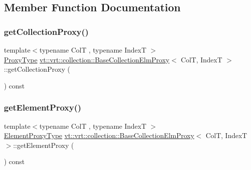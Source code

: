 \subsection{Member Function Documentation}
\mbox{\label{structvt_1_1vrt_1_1collection_1_1_base_collection_elm_proxy_ae2b8c7f266600f1c68c2036f6be2a463}} 
\subsubsection{\texorpdfstring{get\+Collection\+Proxy()}{getCollectionProxy()}}
{\footnotesize\ttfamily template$<$typename ColT , typename IndexT $>$ \\
\hyperlink{structvt_1_1vrt_1_1collection_1_1_base_collection_elm_proxy_af80f1576659b626a30828c6d85eca926}{Proxy\+Type} \hyperlink{structvt_1_1vrt_1_1collection_1_1_base_collection_elm_proxy}{vt\+::vrt\+::collection\+::\+Base\+Collection\+Elm\+Proxy}$<$ ColT, IndexT $>$\+::get\+Collection\+Proxy (\begin{DoxyParamCaption}{ }\end{DoxyParamCaption}) const\hspace{0.3cm}{\ttfamily [inline]}}

\mbox{\label{structvt_1_1vrt_1_1collection_1_1_base_collection_elm_proxy_a3d5a9639713eabd4705e2c6dc5b6eb5d}} 
\subsubsection{\texorpdfstring{get\+Element\+Proxy()}{getElementProxy()}}
{\footnotesize\ttfamily template$<$typename ColT , typename IndexT $>$ \\
\hyperlink{structvt_1_1vrt_1_1collection_1_1_base_collection_elm_proxy_a0f37a49c04c28fdc6ea8665aefc2f40c}{Element\+Proxy\+Type} \hyperlink{structvt_1_1vrt_1_1collection_1_1_base_collection_elm_proxy}{vt\+::vrt\+::collection\+::\+Base\+Collection\+Elm\+Proxy}$<$ ColT, IndexT $>$\+::get\+Element\+Proxy (\begin{DoxyParamCaption}{ }\end{DoxyParamCaption}) const\hspace{0.3cm}{\ttfamily [inline]}}

